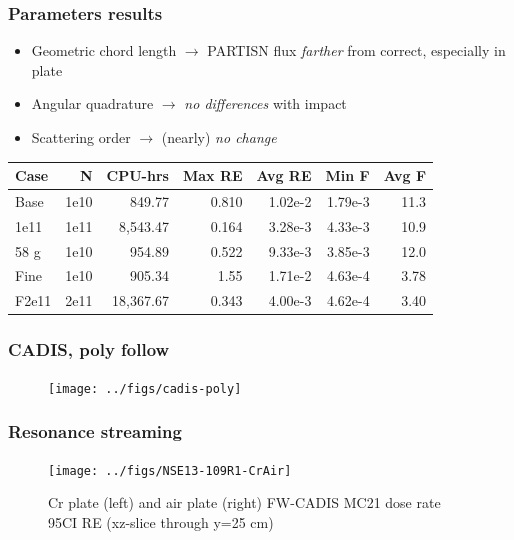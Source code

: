 \documentclass[xcolor=x11names,compress]{beamer}
\renewcommand{\(}{\begin{columns}}
\renewcommand{\)}{\end{columns}}
\newcommand{\<}[1]{\begin{column}{#1}}
\renewcommand{\>}{\end{column}}
\begin{document}
\begin{frame}[fragile]
  \frametitle{Parameters results}
  
  	\begin{itemize}
  	\item Geometric chord length $\rightarrow$ PARTISN flux \textit{farther} from correct, especially in plate
  	\item Angular quadrature $\rightarrow$ \textit{no differences} with impact
	\item Scattering order $\rightarrow$ (nearly) \textit{no change}
  	\end{itemize}
  	
  \begin{center}
    \begin{tabu}{|l|r|r|r|r|r|r|}\hline
      Case & N & CPU-hrs & Max RE & Avg RE & Min F & Avg F\\\hline
Base      & 1e10 & 849.77    & 0.810 & 1.02e-2 & 1.79e-3 & 11.3\\
%
1e11 & 1e11 & 8,543.47  & 0.164 & 3.28e-3 & \alert{4.33e-3} & 10.9\\
%
58 g & 1e10 & 954.89    & 0.522 & 9.33e-3 & \alert{3.85e-3} & 12.0\\
%
Fine & 1e10 & 905.34    & 1.55  & 1.71e-2 & 4.63e-4 & 3.78\\
%
F2e11 & 2e11 & 18,367.67 & 0.343 & 4.00e-3 & 4.62e-4 & 3.40\\\hline
    \end{tabu}
  \end{center}

\end{frame}


\begin{frame}[fragile]
  \frametitle{CADIS, poly follow}
 \begin{figure}[p]
   \begin{center}
     \texttt{[image: ../figs/cadis-poly]}
   \end{center}
 \end{figure}
\end{frame}


\begin{frame}[fragile]
  \frametitle{Resonance streaming}
   \begin{figure}[p]
   \begin{center}
     \texttt{[image: ../figs/NSE13-109R1-CrAir]}
   \end{center}
   \caption{Cr plate (left) and air plate (right) FW-CADIS MC21 dose rate 95CI RE (xz-slice through y=25 cm)}
   \label{fig:CrAir}
 \end{figure}
\end{frame}
\end{document}
